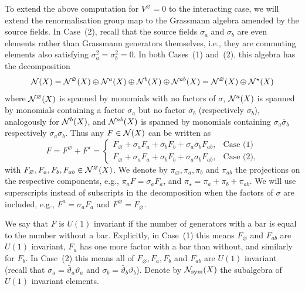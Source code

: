 \documentclass[11pt]{amsart}
\numberwithin{equation}{section}
\numberwithin{theorem}{section}
\newcommand{\1}{{\bf 1}}
\newcommand{\obs}{\star}
\newcommand{\Vbulk}{V^\varnothing}
\begin{document}
To extend the above computation for $\Vbulk=0$ to the interacting
case, we will extend the renormalisation group map to the Grassmann
algebra amended by the source fields.
In Case~(2), recall that the source fields $\sigma_a$ and
$\sigma_b$ are even elements
rather than Grassmann generators themselves,
i.e., they are commuting elements also satisfying
$\sigma_a^2=\sigma_b^2=0$.
In both Cases~(1) and~(2), this algebra has the decomposition
\begin{equation} \label{e:Nabdecomp}
  \cN(X) = \cN^\varnothing(X) \oplus \cN^a(X) \oplus \cN^{b}(X) \oplus \cN^{ab}(X)
  = \cN^\varnothing(X) \oplus \cN^\obs(X)
\end{equation}
where $\mathcal N^\varnothing(X)$ is spanned by monomials with no factors of $\sigma$,
$\mathcal N^a(X)$ is spanned by monomials containing a factor $\sigma_a$ but
no factor $\bar\sigma_b$ (respectively $\sigma_b$), analogously for $\mathcal N^b(X)$,
and $\mathcal N^{ab}(X)$ is spanned by monomials containing $\sigma_a\bar\sigma_b$ respectively $\sigma_a\sigma_b$.
Thus any $F \in \mathcal N(X)$ can be written as
\begin{equation} \label{e:Fdecomp}
  F
  = F^\varnothing + F^\obs
  = 
  \begin{cases}
    F_\varnothing+\sigma_aF_a+\bar\sigma_bF_b+\sigma_a\bar\sigma_bF_{ab}, & \text{Case (1)}
    \\
    F_\varnothing+\sigma_aF_a+\sigma_bF_b+\sigma_a\sigma_bF_{ab}, & \text{Case (2)},
  \end{cases}
\end{equation}
with $F_\varnothing,F_a,F_b,F_{ab} \in \mathcal N^\varnothing(X)$.  We denote
by $\pi_{\varnothing},\pi_{a},\pi_b$ and $\pi_{ab}$ the projections on
the respective components, e.g., $\pi_aF =\sigma_aF_a$, and
$\pi_\obs = \pi_a+\pi_b+\pi_{ab}$.  We will use superscripts instead
of subscripts in the decomposition when the factors of $\sigma$ are
included, e.g., $F^a= \sigma_aF_a$ and $F^\varnothing=F_\varnothing$.

We say that $F$ is $U(1)$ invariant if the number of generators with
a bar is equal to the number without a bar.  Explicitly, in Case~(1) this means
$F_{\varnothing} $ and $F_{ab}$ are $U(1)$ invariant, $F_{a}$ has one
more factor with a bar than without, and similarly for $F_{b}$. In
Case~(2) this means all of $F_{\varnothing},F_{a},F_{b}$ and $F_{ab}$
are $U(1)$ invariant (recall that
$\sigma_{a}=\bar\vartheta_{a}\vartheta_{a}$ and $\sigma_{b}=\bar\vartheta_{b}\vartheta_{b}$).
Denote by $\mathcal N_{\rm sym}(X)$ the subalgebra of
$U(1)$ invariant elements.
\end{document}
